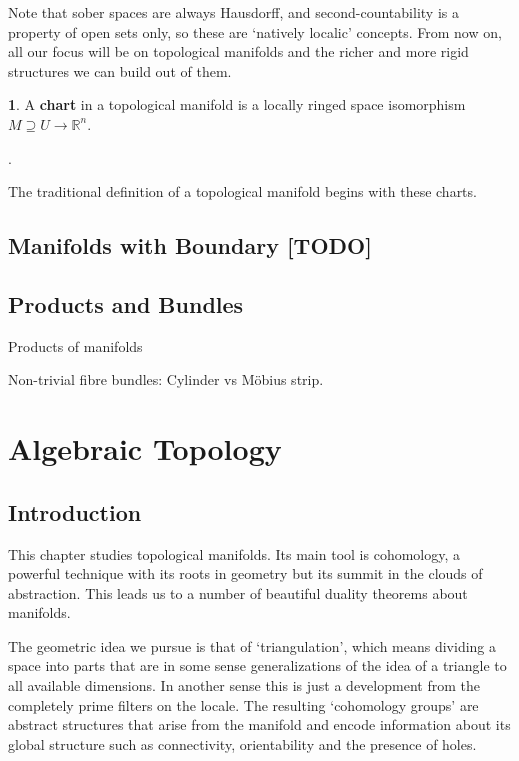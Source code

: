 \documentclass[oneside,english]{amsbook}
\numberwithin{section}{chapter}
\theoremstyle{plain}
\theoremstyle{definition}
\newtheorem{defn}[thm]{\protect\definitionname}
\providecommand{\definitionname}{Definition}
\begin{document}
Note that sober spaces are always Hausdorff, and second-countability is a property of open sets only, so these are `natively localic' concepts. From now on, all our focus will be on topological manifolds and the richer and more rigid structures we can build out of them.

\begin{defn}
	A \textbf{chart} in a topological manifold is a locally ringed space isomorphism $M\supseteq U\to \mathbb{R}^n$.
\end{defn}.

The traditional definition of a topological manifold begins with these charts.




\section{Manifolds with Boundary [TODO]}


\section{Products and Bundles}

Products of manifolds

Non-trivial fibre bundles: Cylinder vs M{\"o}bius strip. 



\chapter{Algebraic Topology}

\section{Introduction}

This chapter studies topological manifolds. Its main tool is cohomology, a powerful technique with its roots in geometry but its summit in the clouds of abstraction. This leads us to a number of beautiful duality theorems about manifolds. 

The geometric idea we pursue is that of `triangulation', which means dividing a space into parts that are in some sense generalizations of the idea of a triangle to all available dimensions. In another sense this is just a development from the completely prime filters on the locale. The resulting `cohomology groups' are abstract structures that arise from the manifold and encode information about its global structure such as connectivity, orientability and the presence of holes. 
\end{document}
